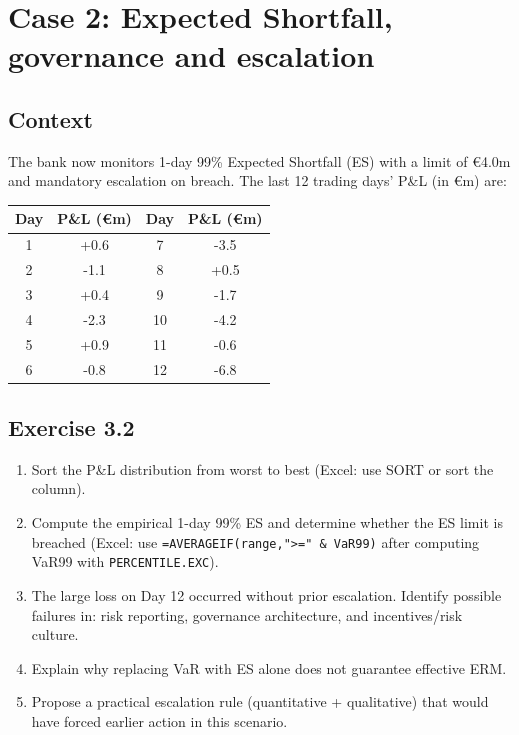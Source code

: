 \documentclass[11pt]{article}
\begin{document}
\bigskip
\section{Case 2: Expected Shortfall, governance and escalation}
\subsection*{Context}
The bank now monitors 1-day 99\% Expected Shortfall (ES) with a limit of \euro 4.0m and mandatory escalation on breach. The last 12 trading days' P\&L (in \euro m) are:

\begin{center}
\begin{tabular}{cccc}
\toprule
Day & P\&L (\euro m) & Day & P\&L (\euro m) \\
\midrule
1 & +0.6 & 7 & -3.5 \\
2 & -1.1 & 8 & +0.5 \\
3 & +0.4 & 9 & -1.7 \\
4 & -2.3 & 10 & -4.2 \\
5 & +0.9 & 11 & -0.6 \\
6 & -0.8 & 12 & -6.8 \\
\bottomrule
\end{tabular}
\end{center}

\subsection*{Exercise 3.2}
\begin{enumerate}
  \item Sort the P\&L distribution from worst to best (Excel: use SORT or sort the column).
  \item Compute the empirical 1-day 99\% ES and determine whether the ES limit is breached (Excel: use \texttt{=AVERAGEIF(range,">=" & VaR99)} after computing VaR99 with \texttt{PERCENTILE.EXC}).
  \item The large loss on Day 12 occurred without prior escalation. Identify possible failures in: risk reporting, governance architecture, and incentives/risk culture.
  \item Explain why replacing VaR with ES alone does not guarantee effective ERM.
  \item Propose a practical escalation rule (quantitative + qualitative) that would have forced earlier action in this scenario.
\end{enumerate}

\newpage
\end{document}
